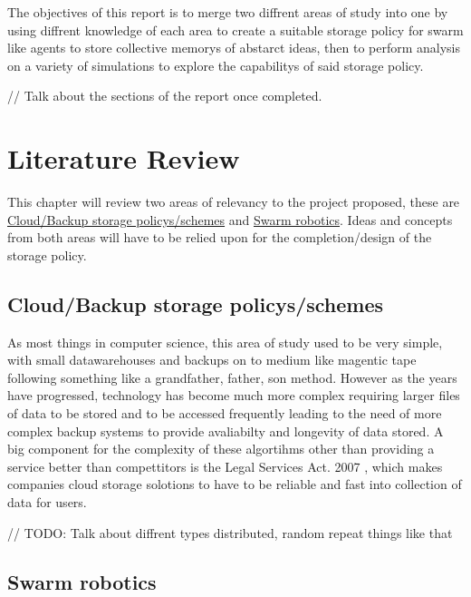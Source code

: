 \documentclass{UoYCSproject}
\begin{document}
The objectives of this report is to merge two diffrent areas of study into one by using diffrent knowledge of each area to create a suitable storage policy for swarm like agents to store collective memorys of abstarct ideas, then to perform analysis on a variety of simulations to explore the capabilitys of said storage policy. 

// Talk about the sections of the report once completed.

\chapter{Literature Review}
\label{cha:Literature Review}

This chapter will review two areas of relevancy to the project proposed, these are \hyperref[sec:Cloud]{Cloud/Backup storage policys/schemes} and \hyperref[sec:Robotics]{Swarm robotics}. Ideas and concepts from both areas will have to be relied upon for the completion/design of the storage policy. 

\section{Cloud/Backup storage policys/schemes}
\label{sec:Cloud}

As most things in computer science, this area of study used to be very simple, with small datawarehouses and backups on to medium like magentic tape following something like a grandfather, father, son method. However as the years have progressed, technology has become much more complex requiring larger files of data to be stored and to be accessed frequently leading to the need of more complex backup systems to provide avaliabilty and longevity of data stored. A big component for the complexity of these algortihms other than providing a service better than compettitors is the Legal Services Act. 2007 \cite{LSA}, which makes companies cloud storage solotions to have to be reliable and fast into collection of data for users. 

// TODO: Talk about diffrent types distributed, random repeat things like that 

\section{Swarm robotics}
\label{sec:Robotics}



\end{document}

